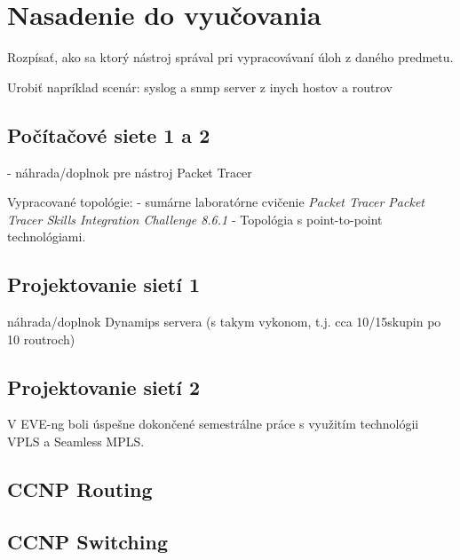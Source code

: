 \chapter{Nasadenie do vyučovania}

Rozpísať, ako sa ktorý nástroj správal pri vypracovávaní úloh z daného predmetu.

Urobiť napríklad scenár: syslog a snmp server z inych hostov a routrov

\section{Počítačové siete 1 a 2}

- náhrada/doplnok pre nástroj Packet Tracer

Vypracované topológie:
- sumárne laboratórne cvičenie \emph{Packet Tracer Packet Tracer Skills Integration Challenge 8.6.1}
- Topológia s point-to-point technológiami.

\section{Projektovanie sietí 1}

náhrada/doplnok Dynamips servera (s takym vykonom, t.j. cca 10/15skupin po 10 routroch)

\section{Projektovanie sietí 2}

V EVE-ng boli úspešne dokončené semestrálne práce s využitím technológii VPLS a Seamless MPLS.

\section{CCNP Routing}

\section{CCNP Switching}